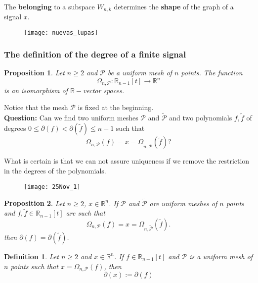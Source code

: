\documentclass[]{beamer}
\newtheorem{prop}{\bf Proposition}
\newtheorem{defi}{\bf Definition}
\theoremstyle{definition}
\newcommand{\IR}{\mathbb{R}}
\newcommand{\cali}[1]{\mathcal{#1}} %
\begin{document}
\begin{frame}

The \textbf{belonging }to a subspace $W_{n,k}$
determines the \textbf{shape} of the graph of a signal $x$.

\begin{figure}[h]
\texttt{[image: nuevas\_lupas]}
\end{figure}
\end{frame}


\begin{frame}
\frametitle{The definition of the degree of a finite signal}


\begin{prop}
Let $n \geq 2$ and $\cali{P}$ be a uniform mesh of $n$ points.
The function 
\[
\Omega_{n, \cali{P}}: \IR_{n-1}[t] \longrightarrow \IR^{n}
\]
is an isomorphism of $\IR-$vector spaces.
\end{prop}

Notice that the mesh $\cali{P}$ is fixed at the beginning. \\

\textbf{Question:}
Can we find two uniform meshes $\cali{P}$ and $\tilde{\cali{P}}$
and two polynomials $f, \tilde{f}$ of degrees
$0 \leq \partial(f) < \partial(\tilde{f}) \leq n-1$
such that
\[
\Omega_{n, \cali{P}}(f) = x = \Omega_{n, \tilde{\cali{P}}}(\tilde{f}) ?
\]
\end{frame}

\begin{frame}
What is certain is that we can not assure uniqueness if
we remove the restriction in the degrees of the polynomials. 
\begin{figure}[h]
\texttt{[image: 25Nov\_1]}
\end{figure}
\end{frame}

\begin{frame}
\begin{prop}
Let $n \geq 2$, $x \in \IR^{n}$. If $\cali{P}$ and $\tilde{\cali{P}}$
are uniform meshes of $n$ points and $f, \tilde{f} \in \IR_{n-1}[t]$ 
are such that
\[
\Omega_{n, \cali{P}}(f) = x = \Omega_{n, \tilde{\cali{P}}}(\tilde{f}).
\]
then $\partial(f) = \partial(\tilde{f})$.
\end{prop}

\begin{defi}
Let $n \geq 2$ and $x \in \IR^{n}$. If $f \in \IR_{n-1}[t]$
and $\cali{P}$ is a uniform mesh of $n$ points such that
$x = \Omega_{n, \cali{P}}(f)$, then 
\[
\partial(x) := \partial(f)
\]
\end{defi}
\end{frame}
\end{document}
